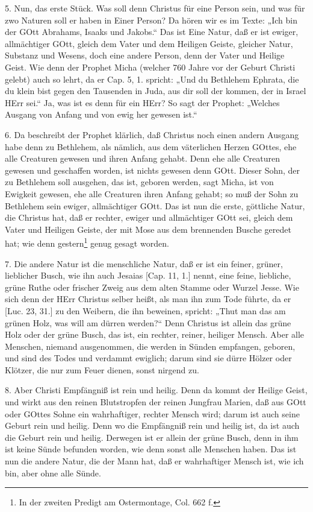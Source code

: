 5. Nun, das erste Stück. Was soll denn Christus für eine Person sein, und was für zwo Naturen soll er haben in Einer Person? Da hören wir es im Texte: „Ich bin der GOtt Abrahams, Isaaks und Jakobs.“ Das ist Eine Natur, daß er ist ewiger, allmächtiger GOtt, gleich dem Vater und dem Heiligen Geiste, gleicher Natur, Substanz und Wesens, doch eine andere Person, denn der Vater und Heilige Geist. Wie denn der Prophet Micha (welcher 760 Jahre vor der Geburt Christi gelebt) auch so lehrt, da er Cap. 5, 1. spricht: „Und du Bethlehem Ephrata, die du klein bist gegen den Tausenden in Juda, aus dir soll der kommen, der in Israel HErr sei.“ Ja, was ist es denn für ein HErr? So sagt der Prophet: „Welches Ausgang von Anfang und von ewig her gewesen ist.“

6. Da beschreibt der Prophet klärlich, daß Christus noch einen andern Ausgang habe denn zu Bethlehem, als nämlich, aus dem väterlichen Herzen GOttes, ehe alle Creaturen gewesen und ihren Anfang gehabt. Denn ehe alle Creaturen gewesen und geschaffen worden, ist nichts gewesen denn GOtt. Dieser Sohn, der zu Bethlehem soll ausgehen, das ist, geboren werden, sagt Micha, ist von Ewigkeit gewesen, ehe alle Creaturen ihren Anfang gehabt; so muß der Sohn zu Bethlehem sein ewiger, allmächtiger GOtt. Das ist nun die erste, göttliche Natur, die Christus hat, daß er rechter, ewiger und allmächtiger GOtt sei, gleich dem Vater und Heiligen Geiste, der mit Mose aus dem brennenden Busche geredet hat; wie denn gestern\footnote{In der zweiten Predigt am Ostermontage, Col. 662 f.} genug gesagt worden.

7. Die andere Natur ist die menschliche Natur, daß er ist ein feiner, grüner, lieblicher Busch,
wie ihn auch Jesaias [Cap. 11, 1.] nennt, eine feine, liebliche, grüne Ruthe oder frischer Zweig aus dem alten Stamme oder Wurzel Jesse. Wie sich denn der HErr Christus selber heißt, als man ihn zum Tode führte, da er [Luc. 23, 31.] zu den Weibern, die ihn beweinen, spricht: „Thut man das am grünen Holz, was will am dürren werden?“ Denn Christus ist allein das grüne Holz oder der grüne Busch, das ist, ein rechter, reiner, heiliger Mensch. Aber alle Menschen, niemand ausgenommen, die werden in Sünden empfangen, geboren, und sind des Todes und verdammt ewiglich; darum sind sie dürre Hölzer oder Klötzer, die nur zum Feuer dienen, sonst nirgend zu.

8. Aber Christi Empfängniß ist rein und heilig. Denn da kommt der Heilige Geist, und wirkt aus den reinen Blutstropfen der reinen Jungfrau Marien, daß aus GOtt oder GOttes Sohne ein wahrhaftiger, rechter Mensch wird; darum ist auch seine Geburt rein und heilig. Denn wo die Empfängniß rein und heilig ist, da ist auch die Geburt rein und heilig. Derwegen ist er allein der grüne Busch, denn in ihm ist keine Sünde befunden worden, wie denn sonst alle Menschen haben. Das ist nun die andere Natur, die der Mann hat, daß er wahrhaftiger Mensch ist, wie ich bin, aber ohne alle Sünde.

